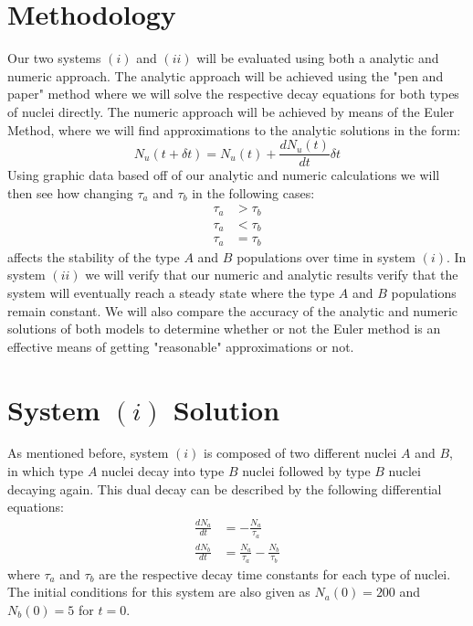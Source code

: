 \documentclass[twocolumn]{article}
\begin{document}
\section{Methodology}
\hspace{\parindent} Our two systems $(i)$ and $(ii)$ will be evaluated using both a analytic and numeric approach. The analytic approach will be achieved using the "pen and paper" method where we will solve the respective decay equations for both types of nuclei directly. The numeric approach will be achieved by means of the Euler Method, where we will find approximations to the analytic solutions in the form: $$N_u(t+\delta t)=N_u(t)+\frac{dN_u(t)}{dt}\delta t$$Using graphic data based off of our analytic and numeric calculations we will then see how changing $\tau_a$ and $\tau_b$ in the following cases:
	\begin{align}
	\tau_a&>\tau_b\\
	\tau_a&<\tau_b\\
	\tau_a&=\tau_b
	\end{align}
affects the stability of the type $A$ and $B$ populations over time in system $(i)$. In system $(ii)$ we will verify that our numeric and analytic results verify that the system will eventually reach a steady state where the type $A$ and $B$ populations remain constant. We will also compare the accuracy of the analytic and numeric solutions of both models to determine whether or not the Euler method is an effective means of getting "reasonable" approximations or not.
\section{System $(i)$ Solution}
\hspace{\parindent} As mentioned before, system $(i)$ is composed of two different nuclei $A$ and $B$, in which type $A$ nuclei decay into type $B$ nuclei followed by type $B$ nuclei decaying again. This dual decay can be described by the following differential equations:
	\begin{align}
	\frac{dN_a}{dt}&=-\frac{N_a}{\tau_a} \\
	\frac{dN_b}{dt}&=\frac{N_a}{\tau_a}-\frac{N_b}{\tau_b}
	\end{align}
where $\tau_a$ and $\tau_b$ are the respective decay time constants for each type of nuclei. The initial conditions for this system are also given as $N_a(0)=200$ and $N_b(0)=5$ for $t=0$. 
\end{document}
